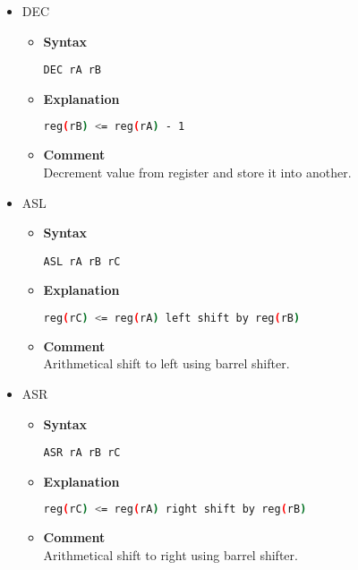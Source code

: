 \begin{itemize}
    \item DEC
    \begin{itemize}
        \item \textbf{Syntax}
        \begin{lstlisting}[language={[markII]Assembler}, frame=single]
    DEC rA rB
        \end{lstlisting}
        \item \textbf{Explanation}
        \begin{lstlisting}[language=bash, frame=single]
    reg(rB) <= reg(rA) - 1
        \end{lstlisting}
        \item \textbf{Comment} \\
    Decrement value from register and store it into another.
    \end{itemize}

    \item ASL
    \begin{itemize}
        \item \textbf{Syntax}
        \begin{lstlisting}[language={[markII]Assembler}, frame=single]
    ASL rA rB rC
        \end{lstlisting}
        \item \textbf{Explanation}
        \begin{lstlisting}[language=bash, frame=single]
    reg(rC) <= reg(rA) left shift by reg(rB)
        \end{lstlisting}
        \item \textbf{Comment} \\
    Arithmetical shift to left using barrel shifter.
    \end{itemize}

    \item ASR
    \begin{itemize}
        \item \textbf{Syntax}
        \begin{lstlisting}[language={[markII]Assembler}, frame=single]
    ASR rA rB rC
        \end{lstlisting}
        \item \textbf{Explanation}
        \begin{lstlisting}[language=bash, frame=single]
    reg(rC) <= reg(rA) right shift by reg(rB)
        \end{lstlisting}
        \item \textbf{Comment} \\
    Arithmetical shift to right using barrel shifter.
    \end{itemize}


\end{itemize}
